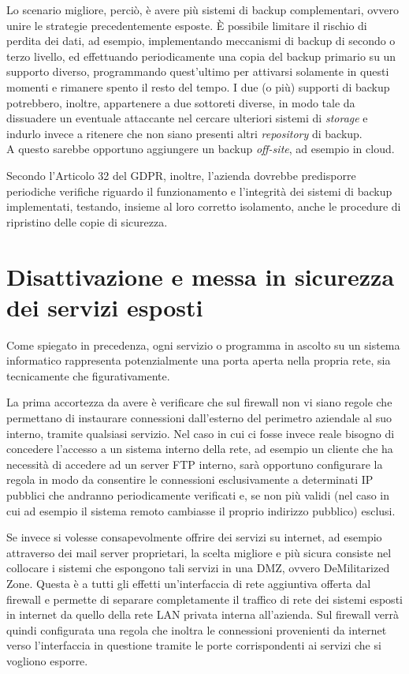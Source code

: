 \documentclass[target=bach,aauheader=]{thud}
\begin{document}
Lo scenario migliore, perciò, è avere più sistemi di backup complementari, ovvero unire le strategie precedentemente esposte. È possibile limitare il rischio di perdita dei dati, ad esempio, implementando meccanismi di backup di secondo o terzo livello, ed effettuando periodicamente una copia del backup primario su un supporto diverso, programmando quest'ultimo per attivarsi solamente in questi momenti e rimanere spento il resto del tempo. I due (o più) supporti di backup potrebbero, inoltre, appartenere a due sottoreti diverse, in modo tale da dissuadere un eventuale attaccante nel cercare ulteriori sistemi di \textit{storage} e indurlo invece a ritenere che non siano presenti altri \textit{repository} di backup.
\\ A questo sarebbe opportuno aggiungere un backup \textit{off-site}, ad esempio in cloud.

Secondo l'Articolo 32 del GDPR, inoltre, l'azienda dovrebbe predisporre periodiche verifiche riguardo il funzionamento e l'integrità dei sistemi di backup implementati, testando, insieme al loro corretto isolamento, anche le procedure di ripristino delle copie di sicurezza.

\section{Disattivazione e messa in sicurezza dei servizi esposti}

Come spiegato in precedenza, ogni servizio o programma in ascolto su un sistema informatico rappresenta potenzialmente una porta aperta nella propria rete, sia tecnicamente che figurativamente.

La prima accortezza da avere è verificare che sul firewall non vi siano regole che permettano di instaurare connessioni dall'esterno del perimetro aziendale al suo interno, tramite qualsiasi servizio. Nel caso in cui ci fosse invece reale bisogno di concedere l'accesso a un sistema interno della rete, ad esempio un cliente che ha necessità di accedere ad un server FTP interno, sarà opportuno configurare la regola in modo da consentire le connessioni esclusivamente a determinati IP pubblici che andranno periodicamente verificati e, se non più validi (nel caso in cui ad esempio il sistema remoto cambiasse il proprio indirizzo pubblico) esclusi.

Se invece si volesse consapevolmente offrire dei servizi su internet, ad esempio attraverso dei mail server proprietari, la scelta migliore e più sicura consiste nel collocare i sistemi che espongono tali servizi in una DMZ, ovvero DeMilitarized Zone. Questa è a tutti gli effetti un'interfaccia di rete aggiuntiva offerta dal firewall e permette di separare completamente il traffico di rete dei sistemi esposti in internet da quello della rete LAN privata interna all'azienda. Sul firewall verrà quindi configurata una regola che inoltra le connessioni provenienti da internet verso l'interfaccia in questione tramite le porte corrispondenti ai servizi che si vogliono esporre.
\end{document}
